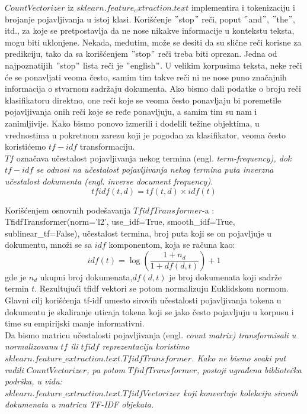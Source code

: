 \documentclass[a4paper]{article}
\begin{document}
$CountVectorizer$ iz $sklearn.feature_extraction.text$ implementira i tokenizaciju i brojanje pojavljivanja u istoj klasi. Korišćenje $"$stop$"$ reči, poput $"$and$"$, $"$the$"$, itd., za koje se pretpostavlja da ne nose nikakve informacije u kontekstu teksta, mogu biti uklonjene. Nekada, međutim, može se desiti da su slične reči korisne za predikciju, tako da sa korišćenjem $"$stop$"$ reči treba biti oprezan. Jedna od najpoznatijih $"$stop$"$ lista reči je $"$english$"$.
U velikim korpusima teksta, neke reči će se ponavljati veoma često, samim tim takve reči ni ne nose puno značajnih informacija o stvarnom sadržaju dokumenta. Ako bismo dali podatke o broju reči klasifikatoru direktno, one reči koje se veoma često ponavljaju bi poremetile pojavljivanja onih reči koje se ređe ponavljuju, a samim tim su nam i zanimljivije. Kako bismo ponovo izmerili i dodelili težine objektima, u vrednostima u pokretnom zarezu koji je pogodan za klasifikator, veoma često koristićemo $tf-idf$ transformaciju. \\
$Tf$ označava učestalost pojavljivanja nekog termina (engl. \em{term-frequency}), dok $tf-idf$ se odnosi na učestalost pojavljivanja nekog termina puta inverzna učestalost dokumenta (engl. \em{inverse document frequency}).
\begin{equation}
tfidf(t,d) = tf(t,d) \times idf(t)
\end{equation}

Korišćenjem osnovnih podešavanja $TfidfTransformer$-a : TfidfTransformer(norm='l2', use\_idf=True, smooth\_idf=True, sublinear\_tf=False), učestalost termina, broj puta koji se on pojavljuje u dokumentu, množi se sa $idf$ komponentom, koja se računa kao:
\begin{equation}
idf(t) = \log(\frac{1 + n_d}{1 + df(d,t)}) +1
\end{equation}
gde je $n_d$ ukupni broj dokumenata,$df(d,t)$ je broj dokumenata koji sadrže termin $t$. Rezultujući tfidf vektori se potom normalizuju Euklidskom normom. Glavni cilj korišćenja tf-idf umesto sirovih učestalosti pojavljivanja tokena u dokumentu je skaliranje uticaja tokena koji se jako često pojavljuju u korpusu i time su empirijski manje informativni.\\
Da bismo matricu učestalosti pojavljivanja (engl. \em{count matrix}) transformisali u normalizovanu $tf$ ili $tfidf$ reprezentaciju koristimo\\ 
$sklearn.feature\_extraction.text.TfidfTransformer$.
Kako ne bismo svaki put radili $CountVectorizer$, pa potom $TfidfTransformer$, postoji ugrađena bibliotečka podrška, u vidu:\\
$sklearn.feature\_extraction.text.TfidfVectorizer$
koji konvertuje kolekciju sirovih dokumenata u matricu TF-IDF objekata.\\\\
\end{document}
